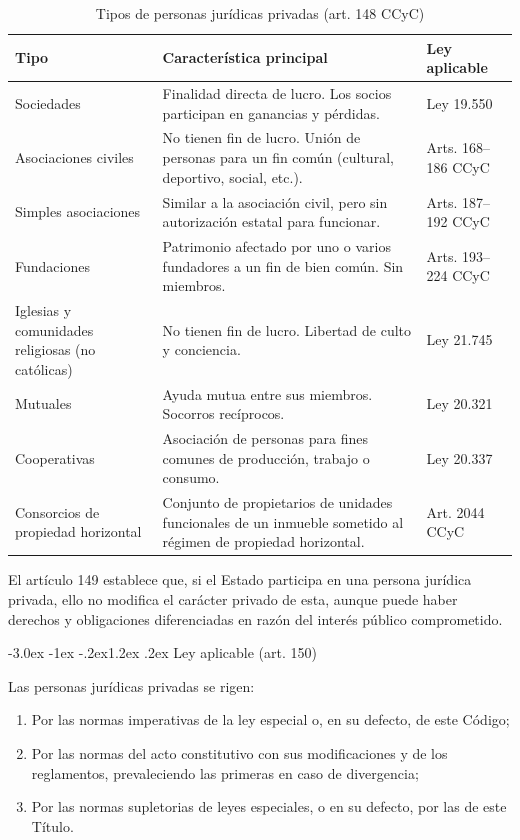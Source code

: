 \documentclass[12pt,oneside]{book}
\makeatletter
\renewcommand\section{\@startsection{section}{1}{\z@}%
  {-3.0ex \@plus -1ex \@minus -.2ex}{1.2ex \@plus .2ex}%
  {\normalfont\large\bfseries\color{acento}}}
\makeatother
\begin{document}
\begin{table}[H]
\centering
\caption{Tipos de personas jurídicas privadas (art. 148 CCyC)}
\begin{tabularx}{\textwidth}{
    >{\raggedright\arraybackslash}p{}
    >{\raggedright\arraybackslash}X
    >{\raggedright\arraybackslash}p{}
}
\toprule
\textbf{Tipo} & \textbf{Característica principal} & \textbf{Ley aplicable} \\
\midrule
Sociedades & Finalidad directa de lucro. Los socios participan en ganancias y pérdidas. & Ley 19.550 \\
Asociaciones civiles & No tienen fin de lucro. Unión de personas para un fin común (cultural, deportivo, social, etc.). & Arts. 168--186 CCyC \\
Simples asociaciones & Similar a la asociación civil, pero sin autorización estatal para funcionar. & Arts. 187--192 CCyC \\
Fundaciones & Patrimonio afectado por uno o varios fundadores a un fin de bien común. Sin miembros. & Arts. 193--224 CCyC \\
Iglesias y comunidades religiosas (no católicas) & No tienen fin de lucro. Libertad de culto y conciencia. & Ley 21.745 \\
Mutuales & Ayuda mutua entre sus miembros. Socorros recíprocos. & Ley 20.321 \\
Cooperativas & Asociación de personas para fines comunes de producción, trabajo o consumo. & Ley 20.337 \\
Consorcios de propiedad horizontal & Conjunto de propietarios de unidades funcionales de un inmueble sometido al régimen de propiedad horizontal. & Art. 2044 CCyC \\
\bottomrule
\end{tabularx}
\end{table}

\begin{nota}
El artículo 149 establece que, si el Estado participa en una persona jurídica privada, ello no modifica el carácter privado de esta, aunque puede haber derechos y obligaciones diferenciadas en razón del interés público comprometido.
\end{nota}

\section{Ley aplicable (art. 150)}

\begin{regla}
Las personas jurídicas privadas se rigen:
\begin{enumerate}
    \item[1.°)] Por las normas imperativas de la ley especial o, en su defecto, de este Código;
    \item[2.°)] Por las normas del acto constitutivo con sus modificaciones y de los reglamentos, prevaleciendo las primeras en caso de divergencia;
    \item[3.°)] Por las normas supletorias de leyes especiales, o en su defecto, por las de este Título.
\end{enumerate}
\end{regla}
\end{document}
